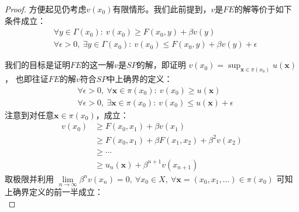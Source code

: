 \begin{proof}
    方便起见仍考虑$v\left(x_0\right)$有限情形。我们此前提到，$v$是$FE$的解等价于如下条件成立：
    \begin{equation*}
        \begin{aligned}
            &\forall y \in \Gamma\left(x_0\right): 
                ~v\left(x_0\right)\geq F\left(x_0,y\right) + \beta v\left(y\right)\\
            &\forall \epsilon > 0, ~\exists y\in \Gamma\left(x_0\right): 
                ~v\left(x_0\right)\leq F\left(x_0,y\right) + \beta v\left(y\right) + \epsilon
        \end{aligned}
    \end{equation*}
    
    我们的目标是证明$FE$的这一解$v$是$SP$的解，即证明
    $v\left(x_0\right)=\sup _{\boldsymbol{x}\in\pi\left(x_0\right)} u\left(\boldsymbol{x}\right)$，
    也即往证$FE$的解$v$符合$SP$中上确界的定义：
    \begin{equation*}
        \begin{aligned}
            &\forall \epsilon > 0, ~\forall \boldsymbol{x}\in \pi\left(x_0\right): 
                ~ v\left(x_0\right)\geq u\left(\boldsymbol{x}\right) \\
            &\forall \epsilon > 0, ~\exists \boldsymbol{x}\in\pi\left(x_0\right): 
                ~ v\left(x_0\right)\leq u\left(\boldsymbol{x}\right)+\epsilon
        \end{aligned}
    \end{equation*}
    注意到对任意$\boldsymbol{x}\in \pi\left(x_0\right)$，成立：
    \begin{equation*}
        \begin{aligned}
            v\left(x_0\right) &\geq F\left(x_0,x_1\right) + \beta v\left(x_1\right) \\
                &\geq  F\left(x_0,x_1\right) + \beta F\left(x_1,x_2\right) + \beta^2v\left(x_2\right) \\
                &\geq \cdots \\
                &\geq u_n\left(\boldsymbol{x}\right)+\beta^{n+1}v\left(x_{n+1}\right)
        \end{aligned}
    \end{equation*}
    取极限并利用
    $\lim\limits_{n\rightarrow \infty}\beta^n v\left(x_n\right)=0, 
        ~ \forall x_0\in X, ~\forall \boldsymbol{x}=\left(x_0,x_1,\dots\right)\in \pi\left(x_0\right)$
    可知上确界定义的前一半成立：
    \begin{equation*}

\end{equation*}
\end{proof}
